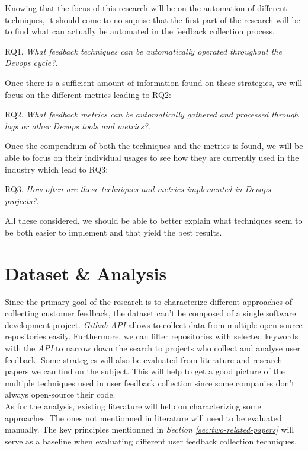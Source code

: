 \documentclass[10pt, conference]{IEEEtran}
\begin{document}
Knowing that the focus of this research will be on the automation of different techniques,
it should come to no suprise that the first part of the research will be to 
find what can actually be automated in the feedback collection process.
\begin{displayquote}
  RQ1. \emph{What feedback techniques can be automatically operated throughout 
  the Devops cycle?}.
\end{displayquote} 
Once there is a sufficient amount of information found on these strategies, we will 
focus on the different metrics leading to RQ2:
\begin{displayquote}
  RQ2. \emph{What feedback metrics can be automatically gathered and processed 
  through logs or other Devops tools and metrics?}.
\end{displayquote} 
Once the compendium of both the techniques and the metrics is found, we 
will be able to focus on their individual usages to see how they are currently 
used in the industry which lead to RQ3:
\begin{displayquote}
  RQ3. \emph{How often are these techniques and metrics implemented in Devops projects?}.
\end{displayquote} 

All these considered, we should be able to better explain what techniques 
seem to be both easier to implement and that yield the best results. 


\section{Dataset \& Analysis}
\label{sec:backgr-relat-work}
Since the primary goal of the research is to characterize different approaches 
of collecting customer feedback, the dataset can't be composed of a single 
software development project. \emph{Github API} allows to collect data from 
multiple open-source repositories easily. Furthermore, we can filter
repositories with selected keywords with the \emph{API} to narrow down the search to 
projects who collect and analyse user feedback. Some strategies will also be 
evaluated from literature and research papers we can find on the subject. This 
will help to get a good picture of the multiple techniques used in user feedback 
collection since some companies don't always open-source their code.\\

As for the analysis, existing literature will help on characterizing some 
approaches. The ones not mentionned in literature will need to be evaluated 
manually. The key principles mentionned in \emph{Section \ref{sec:two-related-papers}}
will serve as a baseline when evaluating different user feedback collection techniques.
\end{document}
